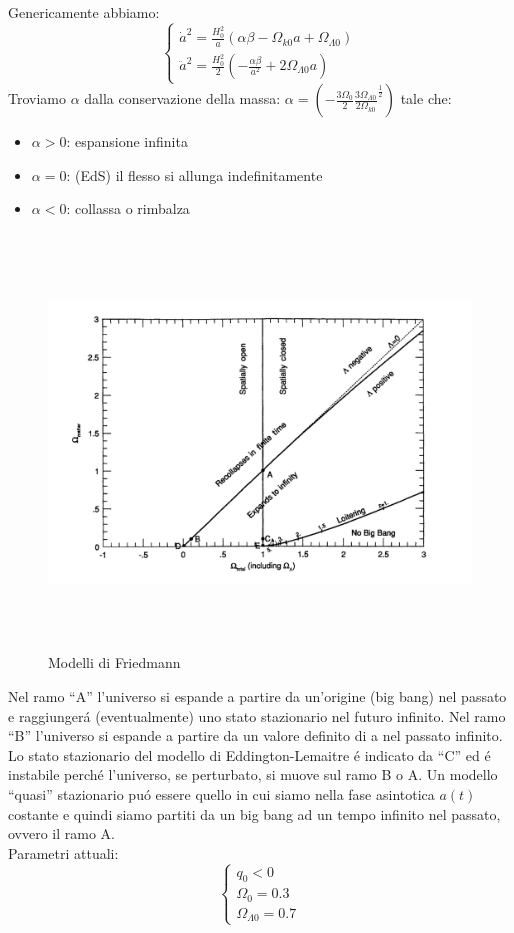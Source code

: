 \documentclass[12pt, a4paper]{article}
\begin{document}
Genericamente abbiamo:
\begin{equation}
     \begin{cases}
          \dot{a}^2=\frac{H_0^2}{a}(\alpha\beta-\Omega_{k0}a+\Omega_{\Lambda0})
         \\
         \ddot{a}^2=\frac{H_0^2}{2}(-\frac{\alpha\beta}{a^2}+2\Omega_{\Lambda0}a)
     \end{cases}
\end{equation}
Troviamo $\alpha$ dalla conservazione della massa: $\alpha=(-\frac{3\Omega_0}{2}\frac{3\Omega_{\Lambda0}}{2\Omega_{k0}}^\frac{1}{2})$ tale che:
\begin{itemize}
    \item $\alpha>0$: espansione infinita
    \item $\alpha=0$: (EdS) il flesso si allunga indefinitamente
    \item $\alpha<0$: collassa o rimbalza
\end{itemize}
\begin{figure}[htp]
    \centering
    \includegraphics[width=16cm, height=11cm]{images/friedmann.png}
    \caption{Modelli di Friedmann}
    \label{fig:modelli}
\end{figure}
Nel ramo “A” l’universo si espande a partire da un’origine (big bang) nel passato e raggiunger\'{a} (eventualmente) uno stato stazionario nel futuro infinito. Nel ramo “B” l’universo si espande a partire da un valore definito di a nel passato infinito. Lo stato stazionario del modello di Eddington-Lemaitre \'{e} indicato da “C” ed \'{e} instabile perch\'{e} l’universo, se perturbato, si muove sul ramo B o A. Un modello “quasi” stazionario pu\'{o} essere quello in cui siamo nella fase asintotica $a(t)$ costante e quindi siamo partiti da un big bang ad un tempo infinito nel passato, ovvero il ramo A.\\
Parametri attuali:
\begin{equation}
     \begin{cases}
          q_0<0
         \\
         \Omega_0=0.3
         \\
         \Omega_{\Lambda 0}=0.7
     \end{cases}
\end{equation}
\end{document}
